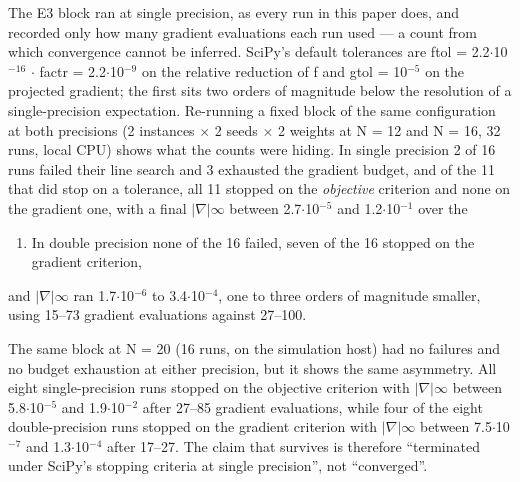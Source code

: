 \documentclass[journal]{IEEEtran}
\begin{document}
The E3 block ran at single precision, as every run in this paper does, and recorded only how many gradient evaluations each run used --- a count from which convergence cannot be inferred. SciPy's default tolerances are ftol = 2.2$\cdot$10$^{-16}$ $\cdot$ factr = 2.2$\cdot$10$^{-9}$ on the relative reduction of f and gtol = 10$^{-5}$ on the projected gradient; the first sits two orders of magnitude below the resolution of a single-precision expectation. Re-running a fixed block of the same configuration at both precisions (2 instances $\times$ 2 seeds $\times$ 2 weights at N = 12 and N = 16, 32 runs, local CPU) shows what the counts were hiding. In single precision 2 of 16 runs failed their line search and 3 exhausted the gradient budget, and of the 11 that did stop on a tolerance, all 11 stopped on the \textit{objective} criterion and none on the gradient one, with a final $|$$\nabla$$|$$\infty$ between 2.7$\cdot$10$^{-5}$ and 1.2$\cdot$10$^{-1}$ over the

\begin{enumerate}
\item In double precision none of the 16 failed, seven of the 16 stopped on the gradient criterion,
\end{enumerate}

and $|$$\nabla$$|$$\infty$ ran 1.7$\cdot$10$^{-6}$ to 3.4$\cdot$10$^{-4}$, one to three orders of magnitude smaller, using 15--73 gradient evaluations against 27--100.


The same block at N = 20 (16 runs, on the simulation host) had no failures and no budget exhaustion at either precision, but it shows the same asymmetry. All eight single-precision runs stopped on the objective criterion with $|$$\nabla$$|$$\infty$ between 5.8$\cdot$10$^{-5}$ and 1.9$\cdot$10$^{-2}$ after 27--85 gradient evaluations, while four of the eight double-precision runs stopped on the gradient criterion with $|$$\nabla$$|$$\infty$ between 7.5$\cdot$10$^{-7}$ and 1.3$\cdot$10$^{-4}$ after 17--27. The claim that survives is therefore ``terminated under SciPy's stopping criteria at single precision'', not ``converged''.
\end{document}
